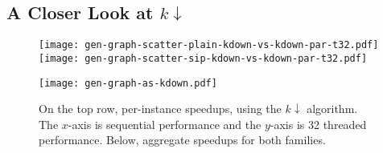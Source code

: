 \documentclass[sigconf]{acmart}
\begin{document}
% 
% 
% 
% 
% 
% 
% 
% 
% 
% 
% 

\subsection{A Closer Look at $k{\downarrow}$}

\begin{figure}[tb]
    \texttt{[image: gen-graph-scatter-plain-kdown-vs-kdown-par-t32.pdf]}
    \hfill
    \texttt{[image: gen-graph-scatter-sip-kdown-vs-kdown-par-t32.pdf]}

    \vspace*{1em}

    \texttt{[image: gen-graph-as-kdown.pdf]}

    \caption{On the top row, per-instance speedups, using the $k{\downarrow}$ algorithm. The
    $x$-axis is sequential performance and the $y$-axis is 32 threaded performance. Below,
    aggregate speedups for both families.}
\end{figure}
\end{document}
